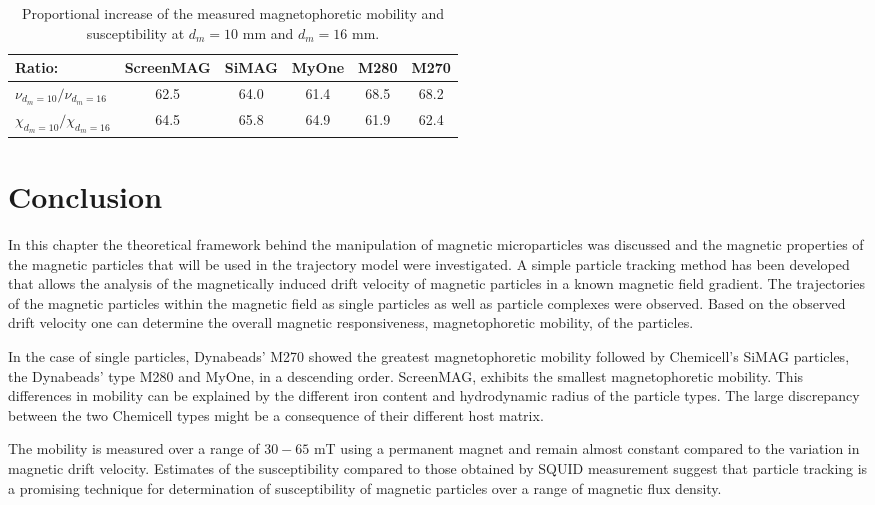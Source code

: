 \begin{table}[htb]
\begin{center}
\caption[Proportional change in magnetophoretic mobility and susceptibility]{Proportional increase of the measured magnetophoretic mobility and susceptibility at $d_{m}=10$ mm and $d_{m}=16$ mm.}\vspace{1ex}
\label{tab:proportionalSusceptibilityMobilityIncrease}
\begin{tabular}{lccccc}\hline
Ratio:  				& ScreenMAG & SiMAG  & MyOne & M280 & M270  \\ 
\hline
$\nu_{d_{m}=10}/\nu_{d_{m}=16}$ 		& 62.5 & 64.0 & 61.4 & 68.5 & 68.2 \\
$\chi_{d_{m}=10}/\chi_{d_{m}=16}$ 	& 64.5 & 65.8 & 64.9 & 61.9 & 62.4 \\
\hline
\end{tabular}
\end{center}
\end{table}

\section{Conclusion}\label{sec:conclusionMagneticParticles}
In this chapter the theoretical framework behind the manipulation of magnetic microparticles was discussed and the magnetic properties of the magnetic particles that will be used in the trajectory model were investigated. A simple particle tracking method has been developed that allows the analysis of the magnetically induced drift velocity of magnetic particles in a known magnetic field gradient. The trajectories of the magnetic particles within the magnetic field as single particles as well as particle complexes were observed. Based on the observed drift velocity one can determine the overall magnetic responsiveness, magnetophoretic mobility, of the particles. 

In the case of single particles, Dynabeads' M270 showed the greatest magnetophoretic mobility followed by Chemicell's SiMAG particles, the Dynabeads' type M280 and MyOne, in a descending order. ScreenMAG, exhibits the smallest magnetophoretic mobility. This differences in mobility can be explained by the different iron content and hydrodynamic radius of the particle types. The large discrepancy between the two Chemicell types might be a consequence of their different host matrix.

The mobility is measured over a range of $30-65$ mT using a permanent magnet and remain almost constant compared to the variation in magnetic drift velocity. Estimates of the susceptibility compared to those obtained by SQUID measurement suggest that particle tracking is a promising technique for determination of susceptibility of magnetic particles over a range of magnetic flux density.

